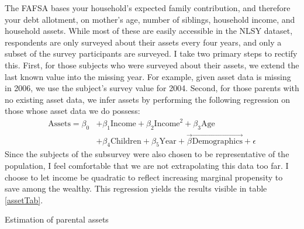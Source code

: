 \documentclass[12pt]{article}
\begin{document}
	The FAFSA bases your household's expected family contribution, and therefore your debt allotment, on mother's age, number of siblings, household income, and household assets. While most of these are easily accessible in the NLSY dataset, respondents are only surveyed about their assets every four years, and only a subset of the survey participants are surveyed. I take two primary steps to rectify this. First, for those subjects who were surveyed about their assets, we extend the last known value into the missing year. For example, given asset data is missing in 2006, we use the subject's survey value for 2004. Second, for those parents with no existing asset data, we infer assets by performing the following regression on those whose asset data we do possess: 
	\begin{equation}
	\begin{aligned}
	\mbox{Assets} = \beta_0 &+ \beta_1 \mbox{Income} + \beta_2 \mbox{Income}^2 + \beta_3 \mbox{Age} \\
	&+ \beta_4 \mbox{Children} + \beta_5 \mbox{Year} + \vec{\beta} \vec{\mbox{Demographics}} + \epsilon
	\end{aligned}
	\end{equation}
	Since the subjects of the subsurvey were also chosen to be representative of the population, I feel comfortable that we are not extrapolating this data too far. I choose to let income be quadratic to reflect increasing marginal propensity to save among the wealthy. This regression yields the results visible in table \ref{assetTab}.
	
	\begin{table}
		\centering
		\caption{Estimation of parental assets}
		
		\label{assetTab}
	\end{table}
\end{document}
